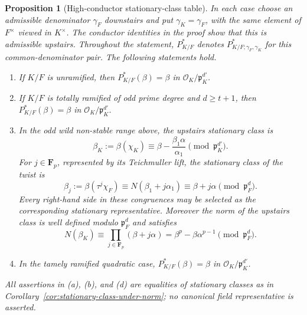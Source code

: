 \documentclass[11pt]{amsart}
\newtheorem{proposition}[theorem]{Proposition}
\theoremstyle{definition}
\theoremstyle{remark}
\newcommand{\F}{\mathbf F}
\newcommand{\cO}{\mathcal O}
\newcommand{\p}{\mathfrak p}
\begin{document}
\begin{proposition}[High-conductor stationary-class table]
\label{prop:high-parameter-table}
In each case choose an admissible denominator $\gamma_F$ downstairs and
put $\gamma_K=\gamma_F$, with the same element of $F^\times$ viewed in
$K^\times$.  The conductor identities in the proof show that this is
admissible upstairs.  Throughout the statement,
$P^*_{K/F}$ denotes
$P^*_{K/F;\gamma_F,\gamma_K}$ for this common-denominator pair.
The following statements hold.
\begin{enumerate}[label=(\alph*)]
\item If $K/F$ is unramified, then
      $P^*_{K/F}(\beta)=\beta$ in $\cO_K/\p_K^{d'}$.
\item If $K/F$ is totally ramified of odd prime degree and
      $d\ge t+1$, then
      $P^*_{K/F}(\beta)=\beta$ in $\cO_K/\p_K^{d'}$.
\item In the odd wild non-stable range above, the upstairs stationary
      class is
\begin{equation}\label{eq:Pstar-intermediate}
 \beta_K:=\beta(\chi_K)
 \equiv \beta-\frac{\beta_1\alpha}{\alpha_1}
 \pmod{\p_K^{d'}}.
\end{equation}
For $j\in\F_p$, represented by its Teichmuller lift, the stationary
class of the twist is
\begin{equation}\label{eq:twist-beta-intermediate}
 \beta_j:=\beta(\tau^j\chi_F)
 \equiv N(\beta_1+j\alpha_1)
 \equiv\beta+j\alpha\pmod{\p_F^d}.
\end{equation}
Every right-hand side in these congruences may be selected as the
corresponding stationary representative.  Moreover the norm of the
upstairs class is well defined modulo $\p_F^d$ and satisfies
\begin{equation}\label{eq:high-product-congruence}
 N(\beta_K)\equiv
 \prod_{j\in\F_p}(\beta+j\alpha)
 =\beta^p-\beta\alpha^{p-1}\pmod{\p_F^d}.
\end{equation}
\item In the tamely ramified quadratic case,
      $P^*_{K/F}(\beta)=\beta$ in $\cO_K/\p_K^{d'}$.
\end{enumerate}
All assertions in (a), (b), and (d) are equalities of stationary
classes as in Corollary~\ref{cor:stationary-class-under-norm}; no
canonical field representative is asserted.
\end{proposition}
\end{document}
